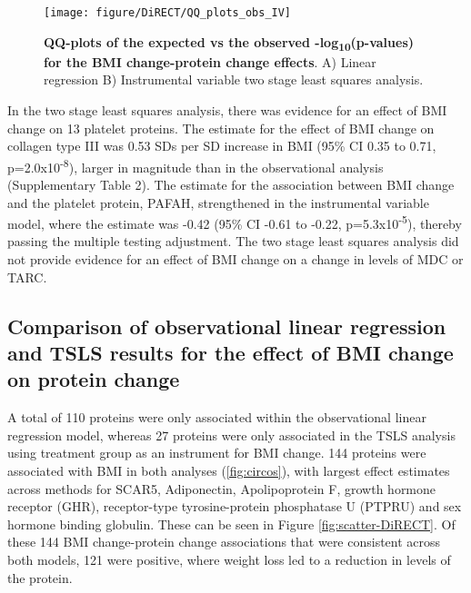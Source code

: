 \documentclass[11pt,twoside]{bristolthesis}
\begin{document}
\begin{figure}
\texttt{[image: figure/DiRECT/QQ\_plots\_obs\_IV]} \caption[QQ-plots of the expected vs the observed -log\textsubscript{10}(p-values) for the BMI change-protein change effects]{\textbf{QQ-plots of the expected vs the observed -log\textsubscript{10}(p-values) for the BMI change-protein change effects}. A) Linear regression B) Instrumental variable two stage least squares analysis.}\label{fig:qq-plot-DiRECT}
\end{figure}
In the two stage least squares analysis, there was evidence for an effect of BMI change on 13 platelet proteins. The estimate for the effect of BMI change on collagen type III was 0.53 SDs per SD increase in BMI (95\% CI 0.35 to 0.71, p=2.0x10\textsuperscript{-8}), larger in magnitude than in the observational analysis (Supplementary Table 2). The estimate for the association between BMI change and the platelet protein, PAFAH, strengthened in the instrumental variable model, where the estimate was -0.42 (95\% CI -0.61 to -0.22, p=5.3x10\textsuperscript{-5}), thereby passing the multiple testing adjustment. The two stage least squares analysis did not provide evidence for an effect of BMI change on a change in levels of MDC or TARC.

\hypertarget{comparison-of-observational-linear-regression-and-tsls-results-for-the-effect-of-bmi-change-on-protein-change}{%
\subsection{Comparison of observational linear regression and TSLS results for the effect of BMI change on protein change}\label{comparison-of-observational-linear-regression-and-tsls-results-for-the-effect-of-bmi-change-on-protein-change}}

A total of 110 proteins were only associated within the observational linear regression model, whereas 27 proteins were only associated in the TSLS analysis using treatment group as an instrument for BMI change. 144 proteins were associated with BMI in both analyses (\ref{fig:circos}), with largest effect estimates across methods for SCAR5, Adiponectin, Apolipoprotein F, growth hormone receptor (GHR), receptor-type tyrosine-protein phosphatase U (PTPRU) and sex hormone binding globulin. These can be seen in Figure \ref{fig:scatter-DiRECT}. Of these 144 BMI change-protein change associations that were consistent across both models, 121 were positive, where weight loss led to a reduction in levels of the protein.
\end{document}
